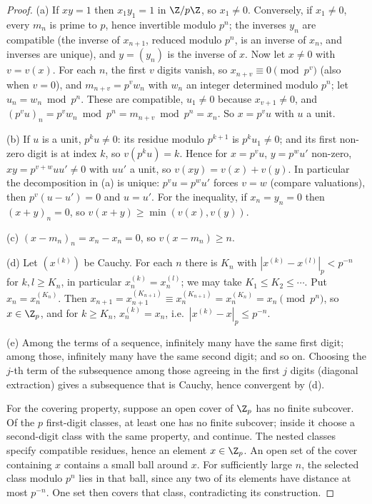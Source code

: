 \begin{proof}
(a) If $xy=1$ then $x_1y_1=1$ in $\Z/p\Z$, so $x_1\ne0$. Conversely, if $x_1\ne0$, every $m_n$ is prime to $p$, hence invertible modulo $p^n$; the inverses $y_n$ are compatible (the inverse of $x_{n+1}$, reduced modulo $p^n$, is an inverse of $x_n$, and inverses are unique), and $y=(y_n)$ is the inverse of $x$. Now let $x\ne0$ with $v=v(x)$. For each $n$, the first $v$ digits vanish, so $x_{n+v}\equiv0\pmod{p^v}$ (also when $v=0$), and $m_{n+v}=p^vw_n$ with $w_n$ an integer determined modulo $p^n$; let $u_n=w_n\bmod p^n$. These are compatible, $u_1\ne0$ because $x_{v+1}\ne0$, and $(p^vu)_n=p^vw_n\bmod p^n=m_{n+v}\bmod p^n=x_n$. So $x=p^vu$ with $u$ a unit.

(b) If $u$ is a unit, $p^ku\ne0$: its residue modulo $p^{k+1}$ is $p^ku_1\ne0$; and its first non-zero digit is at index $k$, so $v(p^ku)=k$. Hence for $x=p^vu$, $y=p^wu'$ non-zero, $xy=p^{v+w}uu'\ne0$ with $uu'$ a unit, so $v(xy)=v(x)+v(y)$. In particular the decomposition in (a) is unique: $p^vu=p^wu'$ forces $v=w$ (compare valuations), then $p^v(u-u')=0$ and $u=u'$. For the inequality, if $x_n=y_n=0$ then $(x+y)_n=0$, so $v(x+y)\ge\min(v(x),v(y))$.

(c) $(x-m_n)_n=x_n-x_n=0$, so $v(x-m_n)\ge n$.

(d) Let $(x^{(k)})$ be Cauchy. For each $n$ there is $K_n$ with $|x^{(k)}-x^{(l)}|_p<p^{-n}$ for $k,l\ge K_n$, in particular $x^{(k)}_n=x^{(l)}_n$; we may take $K_1\le K_2\le\cdots$. Put $x_n=x^{(K_n)}_n$. Then $x_{n+1}=x^{(K_{n+1})}_{n+1}\equiv x^{(K_{n+1})}_n=x^{(K_n)}_n=x_n\pmod{p^n}$, so $x\in\Z_p$, and for $k\ge K_n$, $x^{(k)}_n=x_n$, i.e.\ $|x^{(k)}-x|_p\le p^{-n}$.

(e) Among the terms of a sequence, infinitely many have the same first digit; among those, infinitely many have the same second digit; and so on. Choosing the $j$-th term of the subsequence among those agreeing in the first $j$ digits (diagonal extraction) gives a subsequence that is Cauchy, hence convergent by (d).

For the covering property, suppose an open cover of $\Z_p$ has no finite
subcover. Of the $p$ first-digit classes, at least one has no finite subcover;
inside it choose a second-digit class with the same property, and continue.
The nested classes specify compatible residues, hence an element $x\in\Z_p$.
An open set of the cover containing $x$ contains a small ball around $x$.
For sufficiently large $n$, the selected class modulo $p^n$ lies in that
ball, since any two of its elements have distance at most $p^{-n}$.
One set then covers that class, contradicting its construction.
\end{proof}

